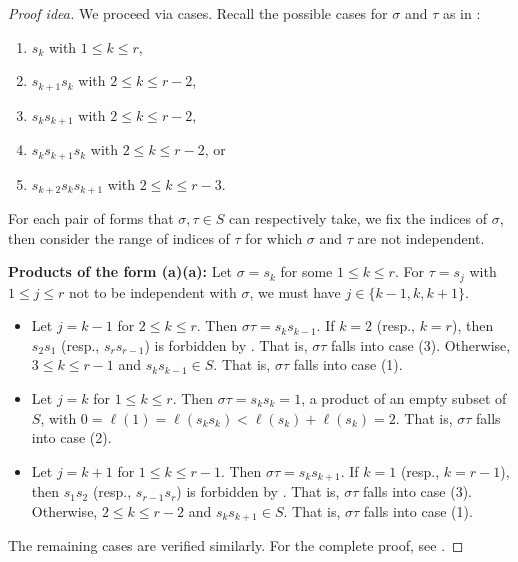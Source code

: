 \documentclass{amsart}
\theoremstyle{definition}
\begin{document}
\begin{proof}[Proof idea]
  We proceed via cases. Recall the possible cases for $\sigma$ and $\tau$ as in :
  \begin{enumerate}
        \item[(a)] $s_k$ with $1 \le k \le r$,
        \item[(b)] $s_{k+1}s_{k}$ with $2 \le k \le r-2$,
        \item[(c)] $s_{k}s_{k+1}$ with $2 \le k \le r-2$, 
        \item[(d)] $s_{k}s_{k+1}s_{k}$ with $2 \le k \le r-2$, or
        \item[(e)] $s_{k+2}s_{k}s_{k+1}$ with $2 \le k \le r-3$.
    \end{enumerate}
    
       For each pair of forms that $\sigma, \tau\in S$ can respectively take, we fix the indices of $\sigma$, then consider the range of indices of $\tau$ for which $\sigma$ and $\tau$ are not independent.
  
  \smallskip

  \noindent \textbf{Products of the form (a)(a):}
    Let $\sigma = s_k$ for some $1 \leq k \leq r$. For $\tau = s_{j}$ with $1\leq j\leq r$ not to be independent with $\sigma$, we must have $j\in\{k-1,k,k+1\}$.
    \begin{itemize}
        \item Let $j=k-1$ for $2\leq k\leq r$. Then $\sigma\tau=s_ks_{k-1}$. If $k=2$ (resp., $k=r$), then $s_2s_1$ (resp., $s_rs_{r-1}$) is forbidden by . That is, $\sigma\tau$ falls into case (3). Otherwise, $3\leq k\leq r-1$ and $s_ks_{k-1}\in S$. That is, $\sigma\tau$ falls into case (1). 
        \item Let $j=k$ for $1\leq k\leq r$. Then $\sigma\tau=s_ks_k=1$, a product of an empty subset of $S$, with $0=\ell(1)=\ell(s_ks_{k})<\ell(s_k)+\ell(s_{k})=2$. That is, $\sigma\tau$ falls into case (2).
        \item Let $j=k+1$ for $1\leq k\leq r-1$. Then $\sigma\tau=s_ks_{k+1}$. If $k=1$ (resp., $k=r-1$), then $s_1s_2$ (resp., $s_{r-1}s_r$) is forbidden by . That is, $\sigma\tau$ falls into case (3). Otherwise, $2\leq k\leq r-2$ and $s_ks_{k+1}\in S$. That is, $\sigma\tau$ falls into case (1).
    \end{itemize}

\noindent The remaining cases are verified similarly.
For the complete proof, see  . 
\end{proof}
\end{document}
